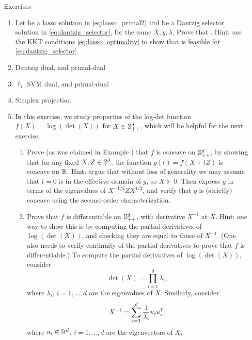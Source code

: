 \clearpage

\begin{xcb}{Exercises}
\begin{enumerate}[label=\thechapter.\arabic*]
\settowidth{\leftmargini}{00.00.\hskip\labelsep}
\item Let  be a lasso solution in 
  \eqref{eq:lasso_primal2} and  be a
  Dantzig selector solution in \eqref{eq:dantzig_selector}, for the same
  $X,y,\lambda$. Prove that . Hint: use the KKT conditions
  \eqref{eq:lasso_optimality} to show that 
  is feasible for \eqref{eq:dantzig_selector}.

\item Dantzig dual, and primal-dual

\item $\ell_1$ SVM dual, and primal-dual

\item \label{ex:simplex_projection}
  Simplex projection 

\item In this exercise, we study properties of the log-det function $f(X) =
  \log(\det(X))$ for $X \in \mathbb{S}_{++}^d$, which will be helpful for the next
  exercise.   

\begin{enumerate}[label=\alph*.]
\item Prove (as was claimed in Example ) that $f$ is
  concave on $\mathbb{S}_{++}^d$, by showing that for any fixed $X,Z \in \mathbb{S}^d$, the  
  function $g(t) = f(X + tZ)$ is concave on $\mathbb{R}$. Hint: argue that without loss
  of generality we may assume that $t = 0$ is in the effective domain of $g$, so
  $X \succ 0$. Then express $g$ in terms of the eigenvalues of $X^{-1/2} Z
  X^{1/2}$, and verify that $g$ is (strictly) concave using the second-order
  characterization.  

\item Prove that $f$ is differentiable on $\mathbb{S}_{++}^d$, with derivative $X^{-1}$
  at $X$. Hint: one way to show this is by computing the partial derivatives of 
  $\log(\det(X))$, and checking they are equal to those of $X^{-1}$. (One
  also needs to verify continuity of the partial derivatives to prove that $f$
  is differentiable.) To compute the partial derivatives of $\log(\det(X))$,
  consider 
  \[
  \det(X) = \prod_{i=1}^d \lambda_i,
  \]
  where $\lambda_i$, $i=1,\dots,d$ are the eigenvalues of $X$. Similarly,
  consider 
  \[
  X^{-1} = \sum_{i=1}^d \frac{1}{\lambda_i} u_i u_i^{\mathsf{T}},
  \]
  where $u_i \in \mathbb{R}^d$, $i=1,\dots,d$ are the eigenvectors of $X$. 
\end{enumerate}


\end{enumerate}
\end{xcb}

